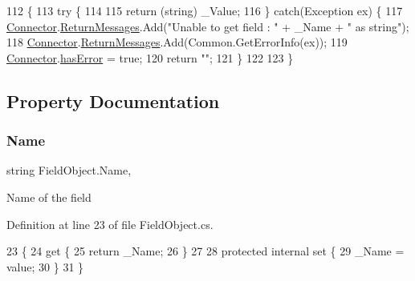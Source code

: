 \begin{DoxyCode}
112                                      \{
113         \textcolor{keywordflow}{try} \{
114 
115             \textcolor{keywordflow}{return} (\textcolor{keywordtype}{string}) \_Value;
116         \} \textcolor{keywordflow}{catch}(Exception ex) \{
117             \mbox{\hyperlink{class_connector}{Connector}}.\mbox{\hyperlink{class_connector_a1ed422674b344524fd77998dcf6a9ba6}{ReturnMessages}}.Add(\textcolor{stringliteral}{"Unable to get field : "} + \_Name + \textcolor{stringliteral}{" as
       string"});
118             \mbox{\hyperlink{class_connector}{Connector}}.\mbox{\hyperlink{class_connector_a1ed422674b344524fd77998dcf6a9ba6}{ReturnMessages}}.Add(Common.GetErrorInfo(ex));
119             \mbox{\hyperlink{class_connector}{Connector}}.\mbox{\hyperlink{class_connector_a079bae21a5417efa53bfe8954c0f533f}{hasError}} = \textcolor{keyword}{true};
120             \textcolor{keywordflow}{return} \textcolor{stringliteral}{""};
121         \}
122         
123     \}
\end{DoxyCode}


\subsection{Property Documentation}
\mbox{\label{class_field_object_ae5d972e96a3eca93407da8e8a89abfd1}} 
\subsubsection{\texorpdfstring{Name}{Name}}
{\footnotesize\ttfamily string Field\+Object.\+Name\hspace{0.3cm}{\ttfamily [get]}, {\ttfamily [set]}}



Name of the field 



Definition at line 23 of file Field\+Object.\+cs.


\begin{DoxyCode}
23                        \{
24         \textcolor{keyword}{get} \{
25             \textcolor{keywordflow}{return} \_Name;
26         \}
27 
28         \textcolor{keyword}{protected} \textcolor{keyword}{internal} \textcolor{keyword}{set} \{
29             \_Name = value;
30         \}
31     \}
\end{DoxyCode}
\mbox{\label{class_field_object_a370af2c26ae9c3e713b5d88b62a2a8f9}} 
